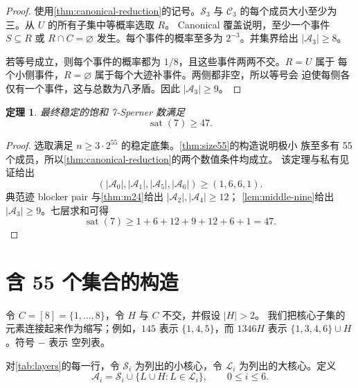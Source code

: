 \documentclass[UTF8,11pt,a4paper,fontset=fandol]{ctexart}
\newtheorem{theorem}{定理}[section]
\theoremstyle{definition}
\theoremstyle{remark}
\newcommand{\smallcores}{\mathcal{S}}
\newcommand{\largecores}{\mathcal{L}}
\newcommand{\sat}{\operatorname{sat}}
\begin{document}
\begin{proof}
使用\cref{thm:canonical-reduction}的记号。$\mathcal S_3$ 与
$\mathcal C_3$ 的每个成员大小至少为三。从 $U$ 的所有子集中等概率选取 $R$。
Canonical 覆盖说明，至少一个事件 $S\subseteq R$ 或
$R\cap C=\varnothing$ 发生。每个事件的概率至多为 $2^{-3}$。并集界给出
$|\mathcal A_3|\geq8$。

若等号成立，则每个事件的概率都为 $1/8$，且这些事件两两不交。$R=U$ 属于
每个小侧事件，$R=\varnothing$ 属于每个大迹补事件。两侧都非空，所以等号会
迫使每侧各仅有一个事件，这与总数为八矛盾。因此
$|\mathcal A_3|\geq9$。
\end{proof}

\begin{theorem}
\label{thm:sat7-lower}
最终稳定的饱和 7-Sperner 数满足
\[
  \sat(7)\geq47.
\]
\end{theorem}

\begin{proof}
选取满足 $n\geq3\cdot2^{55}$ 的稳定底集。\cref{thm:size55}的构造说明极小
族至多有 55 个成员，所以\cref{thm:canonical-reduction}的两个数值条件均成立。
该定理与私有见证给出
\[
  (|\mathcal A_0|,|\mathcal A_1|,|\mathcal A_5|,
  |\mathcal A_6|)\geq(1,6,6,1).
\]
典范迹 blocker pair 与\cref{thm:m24}给出
$|\mathcal A_2|,|\mathcal A_4|\geq12$；
\cref{lem:middle-nine}给出 $|\mathcal A_3|\geq9$。七层求和可得
\[
  \sat(7)\geq1+6+12+9+12+6+1=47.
\]
\end{proof}

\section{含 55 个集合的构造}
\label{sec:construction}

令 $C=[8]=\{1,\ldots,8\}$，令 $H$ 与 $C$ 不交，并假设 $|H|>2$。
我们把核心子集的元素连接起来作为缩写；例如，$145$ 表示
$\{1,4,5\}$，而 $1346H$ 表示 $\{1,3,4,6\}\cup H$。符号 $-$ 表示
空列表。

对\cref{tab:layers}的每一行，令 $\smallcores_i$ 为列出的小核心，令
$\largecores_i$ 为列出的大核心。定义
\[
  \mathcal A_i
   =\smallcores_i\cup\{L\cup H:L\in\largecores_i\},
  \qquad 0\leq i\leq6.
\]
\end{document}
